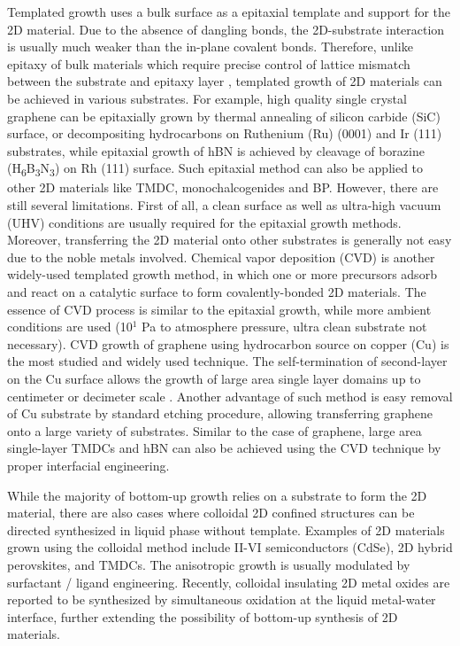 Templated growth uses a bulk surface as a epitaxial template and
support for the 2D material. Due to the absence of dangling bonds, the
2D-substrate interaction is usually much weaker than the in-plane
covalent bonds. Therefore, unlike epitaxy of bulk materials which
require precise control of lattice mismatch between the substrate and
epitaxy layer , templated growth of 2D
materials can be achieved in various substrates. For example, high
quality single crystal graphene can be epitaxially grown by thermal
annealing of silicon carbide (SiC) surface, or decompositing
hydrocarbons on Ruthenium (Ru) (0001) and Ir (111) substrates, while
epitaxial growth of hBN is achieved by cleavage of borazine
(H\textsubscript{6}B\textsubscript{3}N\textsubscript{3}) on Rh (111)
surface.  Such epitaxial method can also be applied to other 2D
materials like TMDC, monochalcogenides and BP. However, there are
still several limitations. First of all, a clean surface as well as
ultra-high vacuum (UHV) conditions are usually required for the
epitaxial growth methods. Moreover, transferring the 2D material onto
other substrates is generally not easy due to the noble metals
involved. Chemical vapor deposition (CVD) is another widely-used
templated growth method, in which one or more precursors adsorb and
react on a catalytic surface to form covalently-bonded 2D
materials. The essence of CVD process is similar to the epitaxial
growth, while more ambient conditions are used (10$^{1}$ Pa to
atmosphere pressure, ultra clean substrate not necessary). CVD growth
of graphene using hydrocarbon source on copper (Cu) is the most
studied and widely used technique. The self-termination of
second-layer on the Cu surface allows the growth of large area single
layer domains up to centimeter or decimeter scale . Another advantage of such method is easy
removal of Cu substrate by standard etching procedure, allowing
transferring graphene onto a large variety of
substrates.  Similar to the case of graphene, large
area single-layer TMDCs and hBN can also be achieved using the CVD technique by proper interfacial engineering. 
%

While the majority of bottom-up growth relies on a substrate to form
the 2D material, there are also cases where colloidal 2D confined
structures can be directed synthesized in liquid phase without
template. Examples of 2D materials grown using the colloidal method
include II-VI semiconductors (CdSe), 2D hybrid perovskites, and
TMDCs. The anisotropic growth is usually modulated by surfactant /
ligand engineering. Recently, colloidal insulating 2D metal oxides are
reported to be synthesized by simultaneous oxidation at the liquid
metal-water interface, further extending the possibility of bottom-up
synthesis of 2D materials. 

